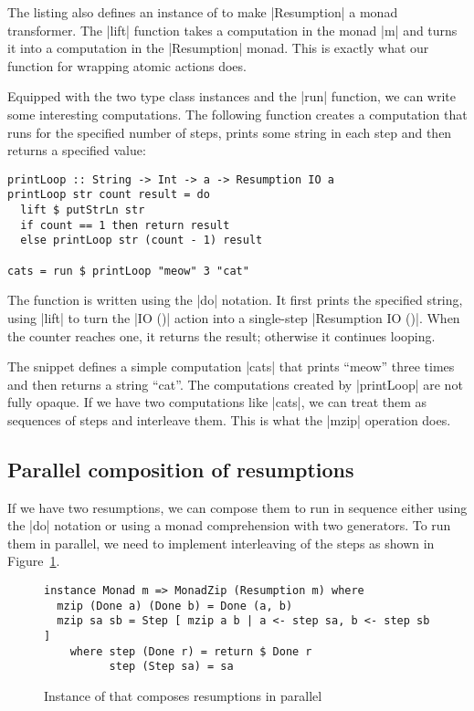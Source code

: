\documentclass{tmr}
\begin{document}
The listing also defines an instance of  to make |Resumption| a monad transformer.
The |lift| function takes a computation in the monad |m| and turns it into a computation in the 
|Resumption| monad. This is exactly what our function for wrapping atomic actions does.

Equipped with the two type class instances and the |run| function, we can write some interesting
computations. The following function creates a computation that runs for the specified number of
steps, prints some string in each step and then returns a specified value:

\begin{verbatim}
printLoop :: String -> Int -> a -> Resumption IO a
printLoop str count result = do
  lift $ putStrLn str
  if count == 1 then return result
  else printLoop str (count - 1) result

cats = run $ printLoop "meow" 3 "cat"
\end{verbatim}
The function is written using the |do| notation. It first prints the specified string, using 
|lift| to turn the |IO ()| action into a single-step |Resumption IO ()|. When the counter reaches
one, it returns the result; otherwise it continues looping.

The snippet defines a simple computation |cats| that prints ``meow'' three times and then 
returns a string ``cat''. The computations created by |printLoop| are not fully opaque. If we have 
two computations like |cats|, we can treat them as sequences of steps and interleave them. 
This is what the |mzip| operation does.


\subsection{Parallel composition of resumptions}

If we have two resumptions, we can compose them to run in sequence either using the |do| notation or
using a monad comprehension with two generators. To run them in parallel, we need to implement
interleaving of the steps as shown in Figure~\ref{fig:poorman-zip}. 

\begin{figure}
\begin{verbatim}
instance Monad m => MonadZip (Resumption m) where
  mzip (Done a) (Done b) = Done (a, b)
  mzip sa sb = Step [ mzip a b | a <- step sa, b <- step sb ]
    where step (Done r) = return $ Done r 
          step (Step sa) = sa
\end{verbatim}
\caption{Instance of  that composes resumptions in parallel}
\label{fig:poorman-zip}
\end{figure}
\end{document}
